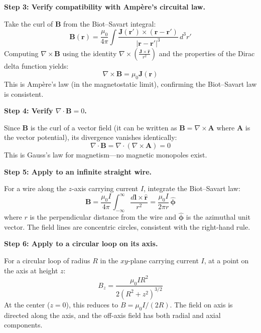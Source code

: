 \textbf{Step 3: Verify compatibility with Ampère's circuital law.}

Take the curl of $\mathbf{B}$ from the Biot--Savart integral:
\begin{equation}
\mathbf{B}(\mathbf{r}) = \frac{\mu_0}{4\pi}\int\frac{\mathbf{J}(\mathbf{r}')\times(\mathbf{r}-\mathbf{r}')}{|\mathbf{r}-\mathbf{r}'|^3}\,d^3r'
\end{equation}
Computing $\nabla\times\mathbf{B}$ using the identity $\nabla\times\left(\frac{\mathbf{J}\times\hat{\mathbf{r}}}{r^2}\right)$ and the properties of the Dirac delta function yields:
\begin{equation}
\nabla\times\mathbf{B} = \mu_0\mathbf{J}(\mathbf{r})
\end{equation}
This is Ampère's law (in the magnetostatic limit), confirming the Biot--Savart law is consistent.

\textbf{Step 4: Verify $\nabla\cdot\mathbf{B} = 0$.}

Since $\mathbf{B}$ is the curl of a vector field (it can be written as $\mathbf{B} = \nabla\times\mathbf{A}$ where $\mathbf{A}$ is the vector potential), its divergence vanishes identically:
\begin{equation}
\nabla\cdot\mathbf{B} = \nabla\cdot(\nabla\times\mathbf{A}) = 0
\end{equation}
This is Gauss's law for magnetism---no magnetic monopoles exist.

\textbf{Step 5: Apply to an infinite straight wire.}

For a wire along the $z$-axis carrying current $I$, integrate the Biot--Savart law:
\begin{equation}
\mathbf{B} = \frac{\mu_0 I}{4\pi}\int_{-\infty}^{\infty}\frac{d\mathbf{l}\times\hat{\mathbf{r}}}{r^2} = \frac{\mu_0 I}{2\pi r}\,\hat{\boldsymbol{\phi}}
\end{equation}
where $r$ is the perpendicular distance from the wire and $\hat{\boldsymbol{\phi}}$ is the azimuthal unit vector. The field lines are concentric circles, consistent with the right-hand rule.

\textbf{Step 6: Apply to a circular loop on its axis.}

For a circular loop of radius $R$ in the $xy$-plane carrying current $I$, at a point on the axis at height $z$:
\begin{equation}
B_z = \frac{\mu_0 I R^2}{2(R^2 + z^2)^{3/2}}
\end{equation}
At the center ($z=0$), this reduces to $B = \mu_0 I/(2R)$. The field on axis is directed along the axis, and the off-axis field has both radial and axial components.

